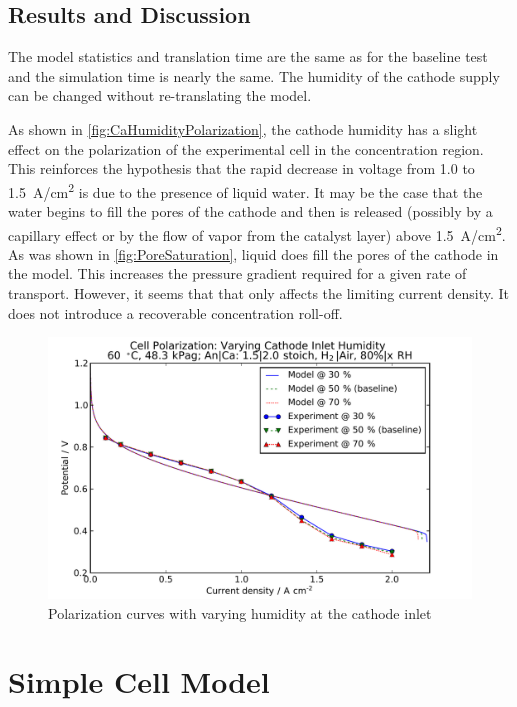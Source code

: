 \subsection{Results and Discussion}

The model statistics and translation time are the same as for the baseline test and the simulation time is nearly the same.  The humidity of the cathode supply can be changed without re-translating the model.  

As shown in \autoref{fig:CaHumidityPolarization}, the cathode humidity has a slight effect on the polarization of the experimental cell in the concentration region.  This reinforces the hypothesis that the rapid decrease in voltage from 1.0 to \SI{1.5}{A/cm^2} is due to the presence of liquid water.  It may be the case that the water begins to fill the pores of the cathode  and then is released (possibly by a capillary effect or by the flow of vapor from the catalyst layer) above \SI{1.5}{A/cm^2}.  As was shown in \autoref{fig:PoreSaturation}, liquid does fill the pores of the cathode  in the model.  This increases the pressure gradient required for a given rate of  transport.  However, it seems that that only affects the limiting current density.  It does not introduce a recoverable concentration roll-off.

\begin{figure}[htbp]
  \includegraphics[width=\linewidth]{Results/Cell/Model/CaHumidity/Polarization}%
  \caption{Polarization curves with varying humidity at the cathode inlet}%
  \label{fig:CaHumidityPolarization}
\end{figure}


\FloatBarrier %
\section{Simple Cell Model}
\label{sec:SimpleCell}

